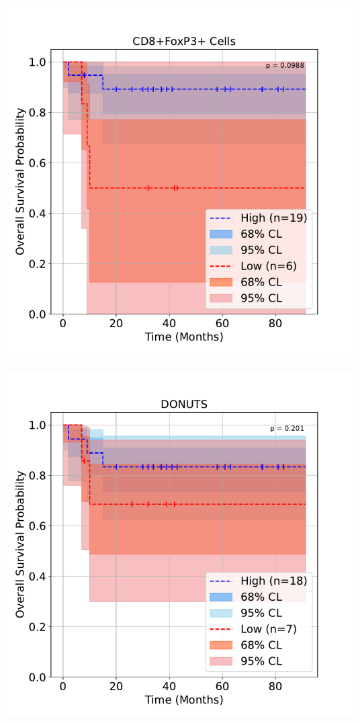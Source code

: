 \documentclass[article]{jss}
\begin{document}
\begin{figure}[p]
  \newcommand{\spacebetweenrows}{1em}
  \centering
  \begin{subfigure}[t]{0.49\textwidth}
    \centering
    \includegraphics[width=\linewidth]{lung_cells_km_OS.pdf}
    \caption{\label{fig:lung-dataset-cells}}
  \end{subfigure}
  \begin{subfigure}[t]{0.49\textwidth}
    \centering
    \includegraphics[width=\linewidth]{lung_donuts_km_OS.pdf}

\end{subfigure}
\end{figure}
\end{document}
